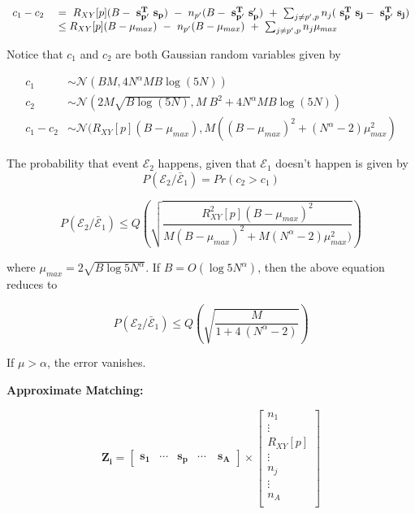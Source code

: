 \[
\begin{array}{ll}
c_1 - c_2 \ &=  \ R_{XY}[p](B - {\bf ~s^T_{p'}~ s_p}) \ - \ n_{p'}(B - {\bf ~s^T_{p'}~ s_p'}) ~ + ~ \sum_{j \neq p',p}n_j ({\bf ~s^T_{p}~ s_j} - {\bf ~s^T_{p'}~ s_j})   \\
&\leq R_{XY}[p] (B-\mu_{max})  \ - \ n_{p'}(B - \mu_{max}) ~ + ~ \sum_{j \neq p',p}n_j \mu_{max} \\
\end{array} 
\]


Notice that $c_1$ and $c_2$ are both Gaussian random variables given by

\[ \begin{array}{ll}
c_1 &\sim  \mathcal{N}(BM,4N^\alpha M B \log(5N)) \\
c_2 &\sim  \mathcal{N}(2M \sqrt{B\log(5N)}, M~B^2 + 4N^\alpha M B \log(5N))\\
c_1 - c_2 &\sim  \mathcal{N}(R_{XY}[p](B-\mu_{max}),M((B-\mu_{max})^2 + (N^{\alpha}-2)\mu_{max}^2)
\end{array}\]

The probability that event $\mathcal{E}_2$ happens, given that $\mathcal{E}_1$ doesn't happen is given by
\[ P(\mathcal{E}_2 / \bar{\mathcal{E}}_1 ) = Pr(c_2 > c_1) \]



\[ P(\mathcal{E}_2 / \bar{\mathcal{E}}_1 ) \leq Q \left( \sqrt{\frac{R_{XY}^{2}[p](B-\mu_{max})^2}{M(B-\mu_{max})^2 + M(N^{\alpha}-2)\mu_{max}^2)}} \right) \]
	
	where $\mu_{max} = 2\sqrt{B \log 5 N^{\alpha}} $. If $B = O(\log 5 N^{\alpha})$, then the above equation reduces to

\[ P(\mathcal{E}_2 / \bar{\mathcal{E}}_1 ) \leq Q \left( \sqrt{\frac{M}{1 + 4 ~ (N^{\alpha}-2)}} \right) \]

If $\mu > \alpha$, the error vanishes.


{\bf Approximate Matching:}


\[
\mathbf{Z_i} = \begin{bmatrix}
\mathbf{s_1}       & \cdots   & \mathbf{s_p} &\cdots \ &\mathbf{s_A}
\end{bmatrix} \times
\begin{bmatrix}
n_1 \\
\vdots \\
R_{XY}[p]\\
\vdots\\
n_j \\
\vdots\\
n_{A}\\
\end{bmatrix}
\]



